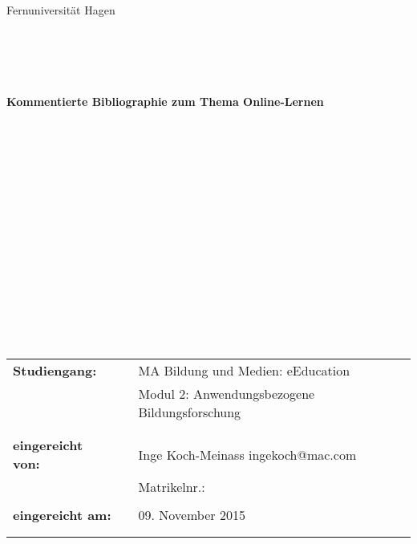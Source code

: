 


%

\begin{titlepage}
\thispagestyle{empty}
\begin{center}
\Large{Fernuniversität Hagen}\\
\end{center}


\begin{center}
\end{center}
\begin{verbatim}





\end{verbatim}
\begin{center}
\textbf{\Large{Kommentierte Bibliographie zum Thema Online-Lernen}}
\end{center}
\begin{verbatim}


\end{verbatim}
\begin{center}
\end{center}
\begin{verbatim}
















\end{verbatim}

\begin{flushleft}
\begin{tabular}{lll}
\textbf{Studiengang:} & & MA Bildung und Medien: eEducation\\
& & Modul 2: Anwendungsbezogene Bildungsforschung\\
& & \\
& & \\
\textbf{eingereicht von:} & & {\color{magenta} Inge Koch-Meinass \flq{}ingekoch@mac.com\frq{}}\\
& & {\color{magenta}Matrikelnr.: }\\
& & \\
\textbf{eingereicht am:} & & 09. November 2015\\
& & \\
& & \\
\end{tabular}
\end{flushleft}

\end{titlepage}